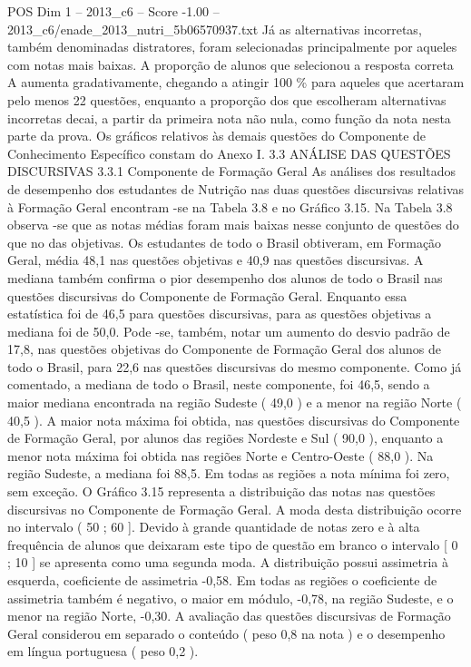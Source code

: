 \begin{textsample}{POS Dim 1 – 2013\_c6 – Score -1.00 – 2013\_c6/enade\_2013\_nutri\_5b06570937.txt}
Já as alternativas incorretas, também denominadas distratores, foram selecionadas principalmente por aqueles com notas mais baixas.
A proporção de alunos que selecionou a resposta correta A aumenta gradativamente, chegando a atingir 100 \% para aqueles que acertaram pelo menos 22 questões, enquanto a proporção dos que escolheram alternativas incorretas decai, a partir da primeira nota não nula, como função da nota nesta parte da prova.
Os gráficos relativos às demais questões do Componente de Conhecimento Específico constam do Anexo I. 3.3 ANÁLISE DAS QUESTÕES DISCURSIVAS 3.3.1 Componente de Formação Geral As análises dos resultados de desempenho dos estudantes de Nutrição nas duas questões discursivas relativas à Formação Geral encontram -se na Tabela 3.8 e no Gráfico 3.15.
Na Tabela 3.8 observa -se que as notas médias foram mais baixas nesse conjunto de questões do que no das objetivas.
Os estudantes de todo o Brasil obtiveram, em Formação Geral, média 48,1 nas questões objetivas e 40,9 nas questões discursivas.
A mediana também confirma o pior desempenho dos alunos de todo o Brasil nas questões discursivas do Componente de Formação Geral.
Enquanto essa estatística foi de 46,5 para questões discursivas, para as questões objetivas a mediana foi de 50,0.
Pode -se, também, notar um aumento do desvio padrão de 17,8, nas questões objetivas do Componente de Formação Geral dos alunos de todo o Brasil, para 22,6 nas questões discursivas do mesmo componente.
Como já comentado, a mediana de todo o Brasil, neste componente, foi 46,5, sendo a maior mediana encontrada na região Sudeste ( 49,0 ) e a menor na região Norte ( 40,5 ).
A maior nota máxima foi obtida, nas questões discursivas do Componente de Formação Geral, por alunos das regiões Nordeste e Sul ( 90,0 ), enquanto a menor nota máxima foi obtida nas regiões Norte e Centro-Oeste ( 88,0 ).
Na região Sudeste, a mediana foi 88,5.
Em todas as regiões a nota mínima foi zero, sem exceção.
O Gráfico 3.15 representa a distribuição das notas nas questões discursivas no Componente de Formação Geral.
A moda desta distribuição ocorre no intervalo ( 50 ; 60 ].
Devido à grande quantidade de notas zero e à alta frequência de alunos que deixaram este tipo de questão em branco o intervalo [ 0 ; 10 ] se apresenta como uma segunda moda.
A distribuição possui assimetria à esquerda, coeficiente de assimetria -0,58.
Em todas as regiões o coeficiente de assimetria também é negativo, o maior em módulo, -0,78, na região Sudeste, e o menor na região Norte, -0,30.
A avaliação das questões discursivas de Formação Geral considerou em separado o conteúdo ( peso 0,8 na nota ) e o desempenho em língua portuguesa ( peso 0,2 ).

\end{textsample}
